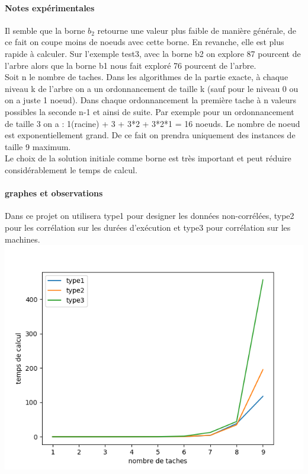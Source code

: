 \documentclass[a4paper, 10pt]{article}
\begin{document}
		\paragraph{Notes expérimentales}{Il semble que la borne $b_2$ retourne une valeur plus faible de manière générale, de ce fait on coupe moins de noeuds avec cette borne. En revanche, elle est plus rapide à calculer. Sur l'exemple test3, avec la borne b2 on explore 87 pourcent de l'arbre alors que la borne b1 nous fait exploré 76 pourcent de l'arbre. \\
                  Soit n le nombre de taches.
                  Dans les algorithmes de la partie exacte, à chaque niveau k de l'arbre on a un ordonnancement de taille k (sauf pour le niveau 0 ou on a juste 1 noeud). Dans chaque ordonnancement la première tache à n valeurs possibles la seconde n-1 et ainsi de suite. Par exemple pour un ordonnancement de taille 3 on a : 1(racine) + 3 + 3*2 + 3*2*1 = 16 noeuds. Le nombre de noeud est exponentiellement grand. De ce fait on prendra uniquement des instances de taille 9 maximum. \\
                  Le choix de la solution initiale comme borne est très important et peut réduire considérablement le temps de calcul.
                }
                \paragraph{graphes et observations}{

                  Dans ce projet on utilisera type1 pour designer les données non-corrélées, type2 pour les corrélation sur les durées d'exécution et type3 pour corrélation sur les machines.\\

                  \includegraphics{graphes/exacte_b1.png}
                  
                  
                }
\end{document}
